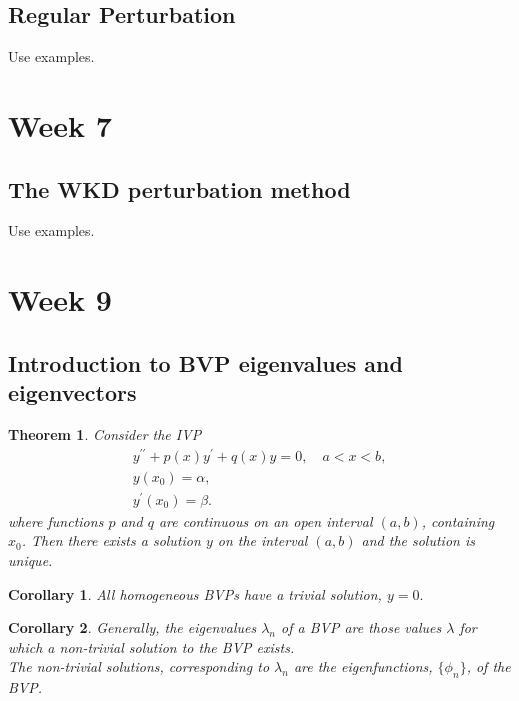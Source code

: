 \documentclass{article}
\newtheorem{theorem}{Theorem}
\newtheorem{corollary}{Corollary}
\begin{document}
\subsection{Regular Perturbation}
Use examples.

\section{Week 7}
\subsection{The WKD perturbation method}
Use examples.


\section{Week 9}
\subsection{Introduction to BVP eigenvalues and eigenvectors}
\begin{theorem}
    Consider the IVP
    \begin{align}
         y^{\prime\prime}+p(x)y^\prime + q(x)y=0,\quad a<x<b, \\
         y(x_0) = \alpha,\\
         y^\prime(x_0) = \beta.
    \end{align}
    where functions $p$ and $q$ are continuous on an open interval $(a,b)$, containing $x_0$. Then there exists a solution $y$ on the interval $(a,b)$ and the solution is unique.
\end{theorem}
\begin{corollary}
    All homogeneous BVPs have a trivial solution, $y=0.$
\end{corollary}
\begin{corollary}
    Generally, the eigenvalues $\lambda_n$ of a BVP are those values $\lambda$ for which a non-trivial solution to the BVP exists.\\
    The non-trivial solutions, corresponding to $\lambda_n$ are the eigenfunctions, $\{ \phi_n \}$, of the BVP.
\end{corollary}
\end{document}
